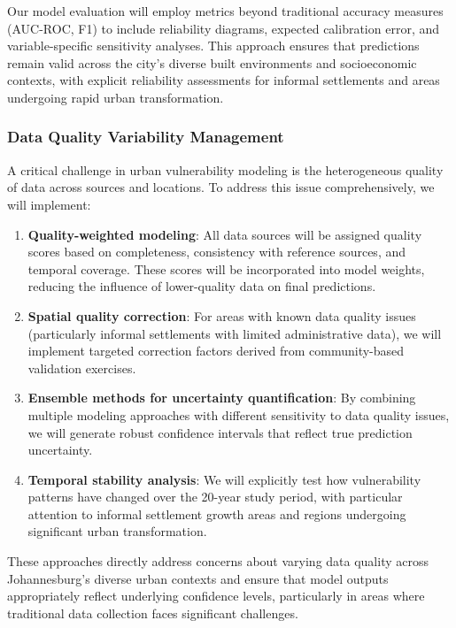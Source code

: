 Our model evaluation will employ metrics beyond traditional accuracy measures (AUC-ROC, F1) to include reliability diagrams, expected calibration error, and variable-specific sensitivity analyses. This approach ensures that predictions remain valid across the city's diverse built environments and socioeconomic contexts, with explicit reliability assessments for informal settlements and areas undergoing rapid urban transformation.

\subsubsection{Data Quality Variability Management}
A critical challenge in urban vulnerability modeling is the heterogeneous quality of data across sources and locations. To address this issue comprehensively, we will implement:

\begin{enumerate}
    \item \textbf{Quality-weighted modeling}: All data sources will be assigned quality scores based on completeness, consistency with reference sources, and temporal coverage. These scores will be incorporated into model weights, reducing the influence of lower-quality data on final predictions.
    
    \item \textbf{Spatial quality correction}: For areas with known data quality issues (particularly informal settlements with limited administrative data), we will implement targeted correction factors derived from community-based validation exercises.
    
    \item \textbf{Ensemble methods for uncertainty quantification}: By combining multiple modeling approaches with different sensitivity to data quality issues, we will generate robust confidence intervals that reflect true prediction uncertainty.
    
    \item \textbf{Temporal stability analysis}: We will explicitly test how vulnerability patterns have changed over the 20-year study period, with particular attention to informal settlement growth areas and regions undergoing significant urban transformation.
\end{enumerate}

These approaches directly address concerns about varying data quality across Johannesburg's diverse urban contexts and ensure that model outputs appropriately reflect underlying confidence levels, particularly in areas where traditional data collection faces significant challenges.

